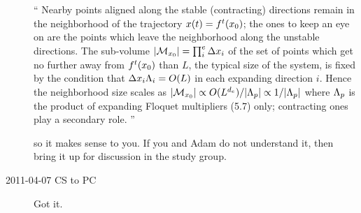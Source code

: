 \begin{description}
``																\toCB
Nearby points aligned along the stable
(contracting) directions  remain in the neighborhood of the
trajectory $x(t)= {f^{t}({x_0})}$; the ones to keep an eye
on are the points which leave the neighborhood along the
unstable directions. The sub-volume $ |{\cal M}_{{x_0}}| = \prod_i^e\Delta
x_i$ of the set of points which get no further away from
${f^{t}({x_0})}$ than $L$, the typical size of the system, is
fixed by the condition that $\Delta x_i \Lambda_i = O(L)$
in each expanding direction $i$. Hence the neighborhood size
scales as
$|{\cal M}_{{x_0}}| \propto O(L^{d_e})/|\Lambda_p| \propto 1/|\Lambda_p| $
where $\Lambda_p$ is the
product of expanding Floquet multipliers
(5.7) %
only;
contracting ones play a secondary role.
''

so it makes sense to you. If you and Adam do not understand it, then
bring it up for discussion in the study group.

\item[2011-04-07 CS to PC] Got it.

\end{description}

